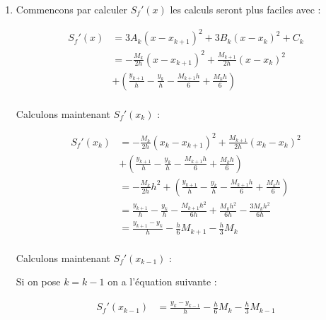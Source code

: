 \documentclass{article}
\begin{document}
\begin{enumerate}
\begin{enumerate}
  \item

    Commencons par calculer $S_f'(x)$ les calculs seront plus faciles
    avec :

    \begin{equation*}
      \begin{split}
        S_f'(x) & = 3 A_k (x - x_{k + 1})^2 + 3 B_k (x - x_k)^2 + C_k
        \\
        & = - \frac{M_k}{2h} (x - x_{k + 1})^2 + 
        \frac{M_{k + 1}}{2h} (x - x_k)^2 \\
        & + \left( \frac{y_{k + 1}}{h} - \frac{y_k}{h} - \frac{M_{k
            + 1} h}{6} + \frac{M_k h}{6} \right) \\
      \end{split}
    \end{equation*}

    Calculons maintenant $S_f'(x_k)$ :

    \begin{equation*}
      \begin{split}
        S_f'(x_k) & = - \frac{M_k}{2h} (x_k - x_{k + 1})^2 + 
        \frac{M_{k + 1}}{2h} (x_k - x_k)^2 \\
        & + \left( \frac{y_{k + 1}}{h} - \frac{y_k}{h} - \frac{M_{k
            + 1} h}{6} + \frac{M_k h}{6} \right) \\
        & = - \frac{M_k}{2h} h^2 + \left( \frac{y_{k + 1}}{h} - \frac{y_k}{h} - \frac{M_{k
            + 1} h}{6} + \frac{M_k h}{6} \right) \\
        & = \frac{y_{k + 1}}{h} - \frac{y_k}{h} - \frac{M_{k
            + 1} h^2}{6h} + \frac{M_k h^2}{6h} - \frac{3 M_k h^2}{6h} \\
        & = \frac{y_{k + 1} - y_k}{h} - \frac{h}{6} M_{k + 1} -
        \frac{h}{3} M_k \\
      \end{split}
    \end{equation*}

    Calculons maintenant $S_f'(x_{k - 1})$ : \newline \newline

    Si on pose $k = k -1$ on a l'équation suivante :

    \begin{equation*}
      \begin{split}
        S_f'(x_{k - 1}) & = \frac{y_k - y_{k - 1}}{h} - \frac{h}{6} M_k -
        \frac{h}{3} M_{k - 1} \\
      \end{split}
    \end{equation*}


\end{enumerate}
\end{enumerate}
\end{document}
